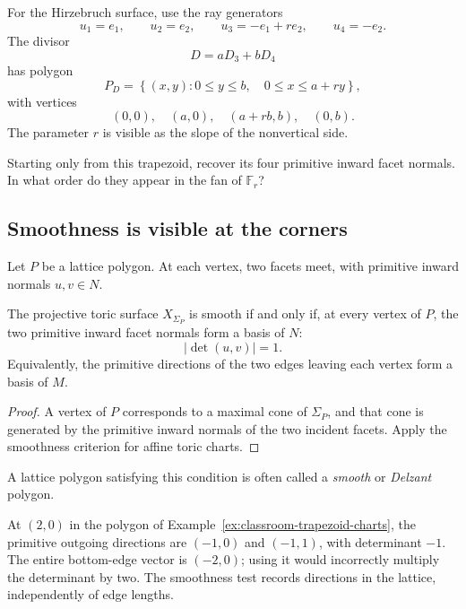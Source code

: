 For the Hirzebruch surface, use the ray generators
\[
u_1=e_1,
\qquad
u_2=e_2,
\qquad
u_3=-e_1+re_2,
\qquad
u_4=-e_2.
\]
The divisor
\[
D=aD_3+bD_4
\]
has polygon
\[
P_D
=
\left\{
(x,y):
0\leq y\leq b,
\quad
0\leq x\leq a+ry
\right\},
\]
with vertices
\[
(0,0),
\quad
(a,0),
\quad
(a+rb,b),
\quad
(0,b).
\]
The parameter \(r\) is visible as the slope of the nonvertical side.

\begin{pauseandthink}
Starting only from this trapezoid, recover its four primitive inward
facet normals. In what order do they appear in the fan of
\(\mathbb F_r\)?
\end{pauseandthink}

\subsection{Smoothness is visible at the corners}

Let \(P\) be a lattice polygon. At each vertex, two facets meet, with
primitive inward normals \(u,v\in N\).

\begin{proposition}
\label{prop:smooth-polygon-criterion}
The projective toric surface \(X_{\Sigma_P}\) is smooth if and only if,
at every vertex of \(P\), the two primitive inward facet normals form
a basis of \(N\):
\[
|\det(u,v)|=1.
\]
Equivalently, the primitive directions of the two edges leaving each
vertex form a basis of \(M\).
\end{proposition}

\begin{proof}
A vertex of \(P\) corresponds to a maximal cone of \(\Sigma_P\), and
that cone is generated by the primitive inward normals of the two
incident facets. Apply the smoothness criterion for affine toric
charts.
\end{proof}

A lattice polygon satisfying this condition is often called a
\emph{smooth} or \emph{Delzant} polygon.

\begin{observation}
At \((2,0)\) in the polygon of
Example~\ref{ex:classroom-trapezoid-charts}, the primitive outgoing
directions are \((-1,0)\) and \((-1,1)\), with determinant \(-1\).
The entire bottom-edge vector is \((-2,0)\); using it would
incorrectly multiply the determinant by two. The smoothness test
records directions in the lattice, independently of edge lengths.
\end{observation}


